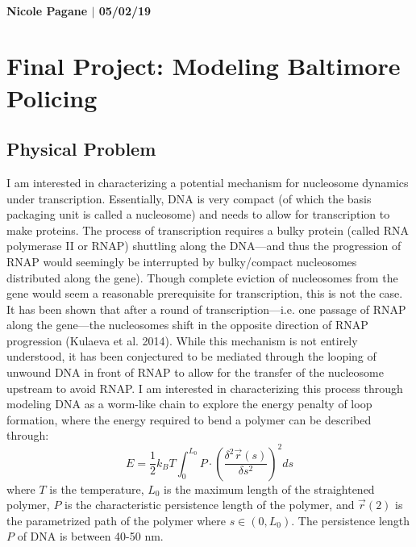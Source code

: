 \documentclass[10pt]{article}
\begin{document}
\paragraph{Nicole Pagane $|$ 05/02/19 }

\section*{Final Project: Modeling Baltimore Policing}

\subsection*{Physical Problem}
I am interested in characterizing a potential mechanism for nucleosome dynamics under transcription. Essentially, DNA is very compact (of which the basis packaging unit is called a nucleosome) and needs to allow for transcription to make proteins. The process of transcription requires a bulky protein (called RNA polymerase II or RNAP) shuttling along the DNA---and thus the progression of RNAP would seemingly be interrupted by bulky/compact nucleosomes distributed along the gene). Though complete eviction of nucleosomes from the gene would seem a reasonable prerequisite for transcription, this is not the case. It has been shown that after a round of transcription---i.e. one passage of RNAP along the gene---the nucleosomes shift in the opposite direction of RNAP progression (Kulaeva et al. 2014). While this mechanism is not entirely understood, it has been conjectured to be mediated through the looping of unwound DNA in front of RNAP to allow for the transfer of the nucleosome upstream to avoid RNAP. I am interested in characterizing this process through modeling DNA as a worm-like chain to explore the energy penalty of loop formation, where the energy required to bend a polymer can be described through:
\begin{equation}
E = \frac{1}{2}k_BT\int_0^{L_0}P\cdot(\frac{\delta^2\vec{r}(s)}{\delta s^2})^2ds
\end{equation}
where $T$ is the temperature, $L_0$ is the maximum length of the straightened polymer, $P$ is the characteristic persistence length of the polymer, and $\vec{r}(2)$ is the parametrized path of the polymer where $s \in (0, L_0)$. The persistence length $P$ of DNA is between 40-50 nm.
\end{document}

